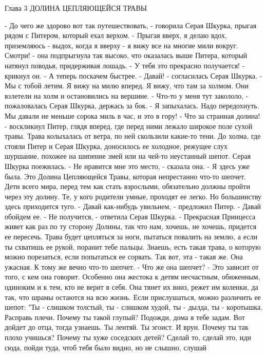 Глава 3
        ДОЛИНА ЦЕПЛЯЮЩЕЙСЯ ТРАВЫ

    - До чего же здорово вот так путешествовать, - говорила Серая 
Шкурка, прыгая рядом с Питером, который ехал верхом. - Прыгая вверх, я 
делаю вдох, приземляюсь - выдох, когда я вверху - я вижу все на многие 
мили вокруг. Смотри! - она подпрыгнула так высоко, что оказалась выше 
Питера, который натянул поводья, придерживая лошадь.
    - У тебя это прекрасно получается! - крикнул он. - А теперь 
поскачем быстрее.
    - Давай! - согласилась Серая Шкурка. - Мы с тобой летим. Я вижу на 
милю вперед. Я вижу, что там за холмом.
    Они взлетели на холм и остановились на вершине.
    - Что-то у меня тут закололо, - пожаловалась Серая Шкурка, держась 
за бок. - Я запыхалась. Надо передохнуть. Мы давали не меньше сорока 
миль в час, и это в гору!
    - Что за странная долина! - воскликнул Питер, глядя вперед, где 
перед ними лежало широкое поле сухой травы. Трава колыхалась от ветра, 
по ней скользили какие-то тени. До холма, где стояли Питер и Серая 
Шкурка, доносилось ее холодное, режущее слух шуршание, похожее на 
шипение змей или на чей-то неустанный шепот.
    Серая Шкурка поежилась.
    - Не нравится мне это место, - сказала она. - Я здесь уже была. 
Это Долина Цепляющейся Травы, которая непрестанно что-то шепчет. Дети 
всего мира, перед тем как стать взрослыми, обязательно должны пройти 
через эту долину. Те, у кого родители умные, проходят ее легко. Но 
большинству здесь приходится туго.
    - Давай как-нибудь увильнем, - предложил Питер. - Давай обойдем 
ее.
    - Не получится, - ответила Серая Шкурка. - Прекрасная Принцесса 
живет как раз по ту сторону Долины, так что нам, хочешь, не хочешь, 
придется ее пересечь. Трава будет цепляться за ноги, пытаться повалить 
на землю, а если ты схватишь ее рукой, поранит тебе пальцы. Знаешь, 
есть такая трава, о которую можно порезаться, если попытаться ее 
сорвать. Так вот, эта - такая же. Она ужасная. К тому же вечно что-то 
шепчет.
    - Что же она шепчет?
    - Это зависит от того, с кем она говорит. Особенно она жестока к 
детям несчастным, обиженным, одиноким и к тем, кто не верит в себя. 
Она тянет их вниз, режет им коленки, да так, что шрамы остаются на всю 
жизнь. Если прислушаться, можно различить ее шепот: "Ты - слишком 
толстый, ты - слишком худой, ты - дылда, ты - коротышка. Расправь 
плечи. Почему ты такой глупый? Подожди, дома я тебе задам. Вот дойдет 
до отца, тогда узнаешь. Ты лентяй. Ты эгоист. И врун. Почему ты так 
плохо учишься? Почему ты хуже соседских детей? Сделай то, сделай это, 
иди сюда, пойди туда, чтоб тебя было видно, но не слышно, слушай 
